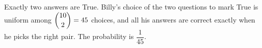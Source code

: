Exactly two answers are True. Billy's choice of the two questions to mark True is uniform among $\dbinom{10}{2}=45$ choices, and all his answers are correct exactly when he picks the right pair. The probability is $\boxed{\dfrac{1}{45}}$.
